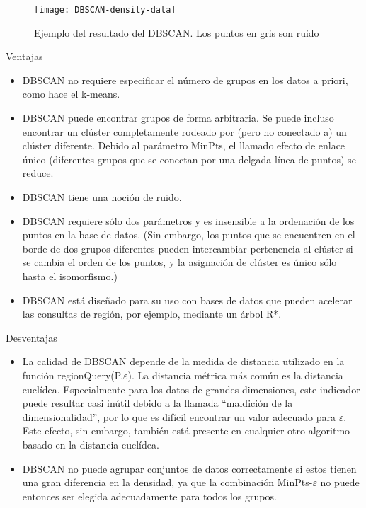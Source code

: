\begin{figure}[ht]
\centering
\texttt{[image: DBSCAN-density-data]}
\label{fig:dbscan0}
\caption{Ejemplo del resultado del DBSCAN. Los puntos en gris son ruido}
\end{figure}

Ventajas
\begin{itemize}
\item DBSCAN no requiere especificar el número de grupos en los datos a priori,
como hace el k-means.
\item DBSCAN puede encontrar grupos de forma arbitraria. Se puede incluso
encontrar un clúster completamente rodeado por (pero no conectado a) un clúster
diferente. Debido al parámetro MinPts, el llamado efecto de enlace único
(diferentes grupos que se conectan por una delgada línea de puntos) se reduce.
\item DBSCAN tiene una noción de ruido.
\item DBSCAN requiere sólo dos parámetros y es insensible a la ordenación de los 
puntos en la base de datos. (Sin embargo, los puntos que se encuentren en el
borde de dos grupos diferentes pueden intercambiar pertenencia al clúster si se
cambia el orden de los puntos, y la asignación de clúster es único sólo hasta el
isomorfismo.)
\item DBSCAN está diseñado para su uso con bases de datos que pueden acelerar
las consultas de región, por ejemplo, mediante un árbol R*.
\end{itemize}

Desventajas
\begin{itemize}
\item La calidad de DBSCAN depende de la medida de distancia utilizado en la
función regionQuery(P,$\varepsilon$). La distancia métrica más común es la
distancia euclídea. Especialmente para los datos de grandes dimensiones, este 
indicador puede resultar casi inútil debido a la llamada ``maldición de la
dimensionalidad'', por lo que es difícil encontrar un valor adecuado para 
$\varepsilon$. Este efecto, sin embargo, también está presente en cualquier otro
algoritmo basado en la distancia euclídea. 
\item DBSCAN no puede agrupar conjuntos de datos correctamente si estos tienen
una gran diferencia en la densidad, ya que la combinación MinPts-$\varepsilon$
no puede entonces ser elegida adecuadamente para todos los grupos.
\end{itemize}

